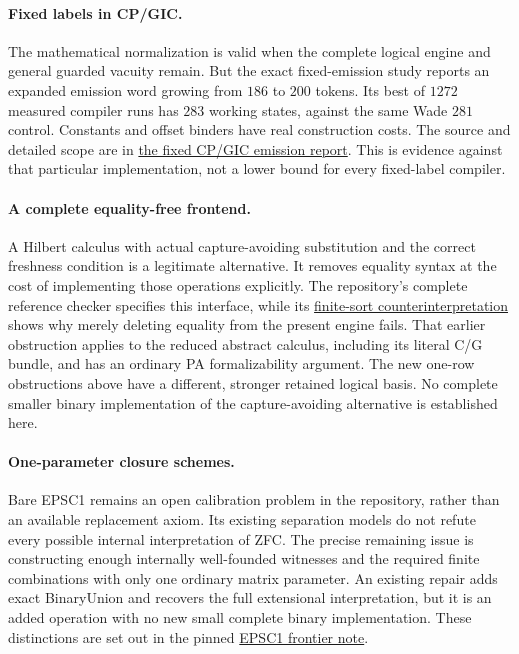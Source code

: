 \paragraph{Fixed labels in CP/GIC.}
The mathematical normalization is valid when the complete logical engine
and general guarded vacuity remain. But the exact fixed-emission study
reports an expanded emission word growing from $186$ to $200$ tokens.
Its best of $1272$ measured compiler runs has $283$ working states,
against the same Wade $281$ control. Constants and offset binders have
real construction costs. The source and detailed scope are in
\href{https://github.com/VladimirReshetnikov/ProveIt/blob/6446ff5668307a2ac6aee1896037f0b792090389/SetTheory/Cardinals/docs/reports/set-theory/zfc-closure-kernels/30-minimize-fixed_emission-README.md}{the fixed CP/GIC emission report}.
This is evidence against that particular implementation, not a lower
bound for every fixed-label compiler.

\paragraph{A complete equality-free frontend.}
A Hilbert calculus with actual capture-avoiding substitution and the
correct freshness condition is a legitimate alternative. It removes
equality syntax at the cost of implementing those operations explicitly.
The repository's complete reference checker specifies this interface,
while its
\href{https://github.com/VladimirReshetnikov/ProveIt/blob/6446ff5668307a2ac6aee1896037f0b792090389/Computability/BusyBeaver/Research/ZFC/typed_countermodel.md}{finite-sort counterinterpretation}
shows why merely deleting equality from the present engine fails. That
earlier obstruction applies to the reduced abstract calculus, including
its literal C/G bundle, and has an ordinary PA formalizability argument.
The new one-row obstructions above have a different, stronger retained
logical basis. No complete smaller binary implementation of the
capture-avoiding alternative is established here.

\paragraph{One-parameter closure schemes.}
Bare EPSC1 remains an open calibration problem in the repository, rather
than an available replacement axiom. Its existing separation models do
not refute every possible internal interpretation of ZFC. The precise
remaining issue is constructing enough internally well-founded witnesses
and the required finite combinations with only one ordinary matrix
parameter. An existing repair adds exact BinaryUnion and recovers the
full extensional interpretation, but it is an added operation with no
new small complete binary implementation. These distinctions are set out
in the pinned
\href{https://github.com/VladimirReshetnikov/ProveIt/blob/6446ff5668307a2ac6aee1896037f0b792090389/Computability/BusyBeaver/Research/ZFC/epsc1_wf_frontier.md}{EPSC1 frontier note}.

